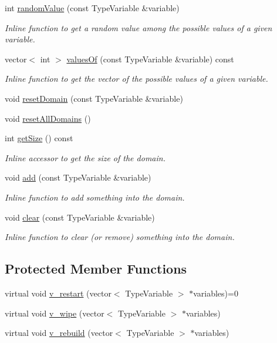 \begin{DoxyCompactItemize}
int \hyperlink{classghost_1_1Domain_abd3f0bd85c98e66c025e0ff3532af8dd}{random\-Value} (const Type\-Variable \&variable)
\begin{DoxyCompactList}\small\item\em Inline function to get a random value among the possible values of a given variable. \end{DoxyCompactList}\item 
vector$<$ int $>$ \hyperlink{classghost_1_1Domain_a5d4e6a323e4c3c14bc1da5ddbd5af55d}{values\-Of} (const Type\-Variable \&variable) const 
\begin{DoxyCompactList}\small\item\em Inline function to get the vector of the possible values of a given variable. \end{DoxyCompactList}\item 
void \hyperlink{classghost_1_1Domain_a2165237b435a5cb4dfd8584680fcfe05}{reset\-Domain} (const Type\-Variable \&variable)
\item 
void \hyperlink{classghost_1_1Domain_aa014a06ba46e4e057ed182d328a72e97}{reset\-All\-Domains} ()
\item 
int \hyperlink{classghost_1_1Domain_af6950190ced9110a04bde5321337d14d}{get\-Size} () const 
\begin{DoxyCompactList}\small\item\em Inline accessor to get the size of the domain. \end{DoxyCompactList}\item 
void \hyperlink{classghost_1_1Domain_aa9386317ee6ca064d1e2018acefaf8bb}{add} (const Type\-Variable \&variable)
\begin{DoxyCompactList}\small\item\em Inline function to add something into the domain. \end{DoxyCompactList}\item 
void \hyperlink{classghost_1_1Domain_ad3b39f88a7becd7c8c347c04963e3414}{clear} (const Type\-Variable \&variable)
\begin{DoxyCompactList}\small\item\em Inline function to clear (or remove) something into the domain. \end{DoxyCompactList}\end{DoxyCompactItemize}
\subsection*{Protected Member Functions}
\begin{DoxyCompactItemize}
\item 
virtual void \hyperlink{classghost_1_1Domain_aee3a6ae1de917ffb936c978633ac2663}{v\-\_\-restart} (vector$<$ Type\-Variable $>$ $\ast$variables)=0
\item 
virtual void \hyperlink{classghost_1_1Domain_ad0adb4cc8b6c9d2b9aec3f20e7fde1ef}{v\-\_\-wipe} (vector$<$ Type\-Variable $>$ $\ast$variables)
\item 
virtual void \hyperlink{classghost_1_1Domain_aef5aef1cb394b5093e9a68c653c54ce5}{v\-\_\-rebuild} (vector$<$ Type\-Variable $>$ $\ast$variables)
\end{DoxyCompactItemize}
